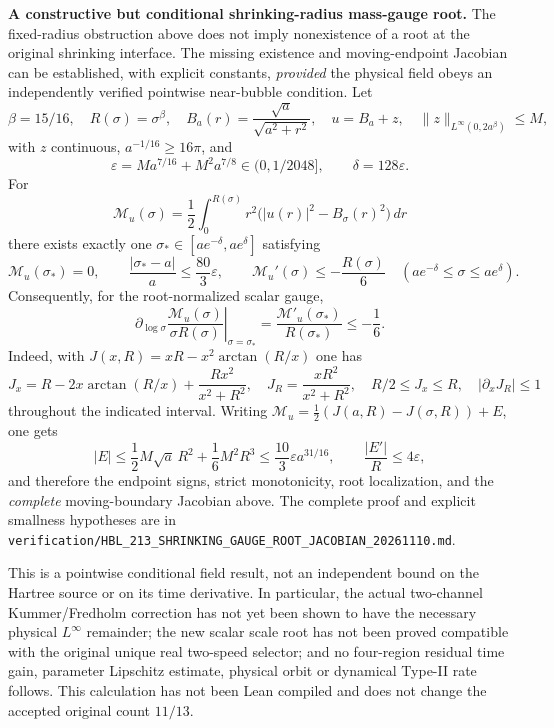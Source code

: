 \documentclass[11pt]{amsart}
\begin{document}
\medskip
\noindent\textbf{A constructive but conditional shrinking-radius mass-gauge root.}
The fixed-radius obstruction above does not imply nonexistence of a root
at the original shrinking interface.  The missing existence and
moving-endpoint Jacobian can be established, with explicit constants,
\emph{provided} the physical field obeys an independently verified
pointwise near-bubble condition.  Let
\[
 \beta=15/16,\quad R(\sigma)=\sigma^\beta,\quad
 B_a(r)=\frac{\sqrt a}{\sqrt{a^2+r^2}},\quad
 u=B_a+z,\quad
 \|z\|_{L^\infty(0,2a^\beta)}\le M,
\]
with $z$ continuous, $a^{-1/16}\ge16\pi$, and
\[
 \varepsilon=M a^{7/16}+M^2 a^{7/8}\in(0,1/2048],
 \qquad \delta=128\varepsilon.
\]
For
\[
 \mathcal M_u(\sigma)=\frac12\int_0^{R(\sigma)}
 r^2\bigl(|u(r)|^2-B_\sigma(r)^2\bigr)\,dr
\]
there exists exactly one
$\sigma_*\in[ae^{-\delta},ae^\delta]$ satisfying
\[
 \mathcal M_u(\sigma_*)=0,\qquad
 \frac{|\sigma_*-a|}{a}\le\frac{80}{3}\varepsilon,
 \qquad
 \mathcal M_u'(\sigma)\le-\frac{R(\sigma)}6
 \quad(ae^{-\delta}\le\sigma\le ae^\delta).
\]
Consequently, for the root-normalized scalar gauge,
\[
 \left.
 \partial_{\log\sigma}\frac{\mathcal M_u(\sigma)}
 {\sigma R(\sigma)}\right|_{\sigma=\sigma_*}
 =\frac{\mathcal M'_u(\sigma_*)}{R(\sigma_*)}
 \le-\frac16.
\]
Indeed, with $J(x,R)=xR-x^2\arctan(R/x)$ one has
\[
 J_x=R-2x\arctan(R/x)+\frac{Rx^2}{x^2+R^2},
 \quad J_R=\frac{xR^2}{x^2+R^2},
 \quad R/2\le J_x\le R,\quad
 |\partial_xJ_R|\le1
\]
throughout the indicated interval.  Writing
$\mathcal M_u=\tfrac12(J(a,R)-J(\sigma,R))+E$, one gets
\[
 |E|\le \frac12M\sqrt a\,R^2+\frac16M^2R^3
 \le\frac{10}{3}\varepsilon a^{31/16},
 \qquad
 \frac{|E'|}{R}\le4\varepsilon,
\]
and therefore the endpoint signs, strict monotonicity, root
localization, and the \emph{complete} moving-boundary Jacobian above.
The complete proof and explicit smallness hypotheses are in
\texttt{verification/HBL\_213\_SHRINKING\_GAUGE\_ROOT\_JACOBIAN\_20261110.md}.

This is a pointwise conditional field result, not an independent
bound on the Hartree source or on its time derivative.  In particular,
the actual two-channel Kummer/Fredholm correction has not yet been
shown to have the necessary physical $L^\infty$ remainder; the new
scalar scale root has not been proved compatible with the original
unique real two-speed selector; and no four-region residual time
gain, parameter Lipschitz estimate, physical orbit or dynamical
Type-II rate follows.  This calculation has not been Lean compiled
and does not change the accepted original count $11/13$.
\end{document}
